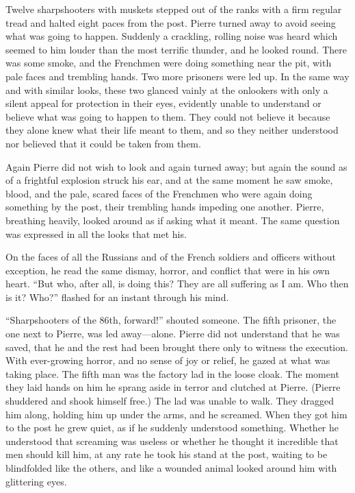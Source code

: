 Twelve sharpshooters with muskets stepped out of the ranks with a
firm regular tread and halted eight paces from the post. Pierre
turned away to avoid seeing what was going to happen. Suddenly a
crackling, rolling noise was heard which seemed to him louder
than the most terrific thunder, and he looked round. There was
some smoke, and the Frenchmen were doing something near the pit,
with pale faces and trembling hands.  Two more prisoners were led
up. In the same way and with similar looks, these two glanced
vainly at the onlookers with only a silent appeal for protection
in their eyes, evidently unable to understand or believe what was
going to happen to them. They could not believe it because they
alone knew what their life meant to them, and so they neither
understood nor believed that it could be taken from them.

Again Pierre did not wish to look and again turned away; but
again the sound as of a frightful explosion struck his ear, and
at the same moment he saw smoke, blood, and the pale, scared
faces of the Frenchmen who were again doing something by the
post, their trembling hands impeding one another. Pierre,
breathing heavily, looked around as if asking what it meant. The
same question was expressed in all the looks that met his.

On the faces of all the Russians and of the French soldiers and
officers without exception, he read the same dismay, horror, and
conflict that were in his own heart. ``But who, after all, is
doing this? They are all suffering as I am. Who then is it?
Who?''  flashed for an instant through his mind.

``Sharpshooters of the 86th, forward!'' shouted someone. The
fifth prisoner, the one next to Pierre, was led
away---alone. Pierre did not understand that he was saved, that
he and the rest had been brought there only to witness the
execution. With ever-growing horror, and no sense of joy or
relief, he gazed at what was taking place. The fifth man was the
factory lad in the loose cloak. The moment they laid hands on him
he sprang aside in terror and clutched at Pierre. (Pierre
shuddered and shook himself free.) The lad was unable to
walk. They dragged him along, holding him up under the arms, and
he screamed. When they got him to the post he grew quiet, as if
he suddenly understood something.  Whether he understood that
screaming was useless or whether he thought it incredible that
men should kill him, at any rate he took his stand at the post,
waiting to be blindfolded like the others, and like a wounded
animal looked around him with glittering eyes.

